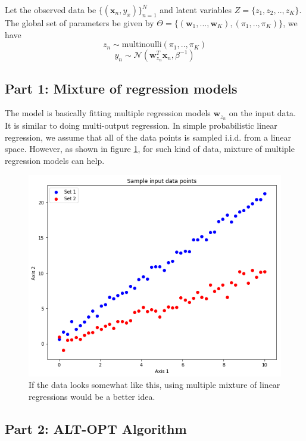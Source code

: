 \documentclass[a4paper,11pt]{article}
\begin{document}
\begin{mlsolution}
Let the observed data be $\{(\textbf{x}_n, y_x)\}^{N}_{n=1}$ and latent variables $Z = \{z_1, z_2, ..,z_K\}$. The global set of parameters be given by $\Theta = \{(\textbf{w}_1,... ,\textbf{w}_K), (\pi_1,..,\pi_K)\}$, we have
\[
z_n \sim \text{multinoulli}(\pi_1,.., \pi_K) 
\]
\[
y_n \sim \mathcal{N}(\textbf{w}^{T}_{z_n}\textbf{x}_n, \beta^{-1})
\]

\subsection{Part 1: Mixture of regression models}
The model is basically fitting multiple regression models $\textbf{w}_{z_n}$ on the input data. It is similar to doing multi-output regression. In simple probabilistic linear regression, we assume that all of the data points is sampled i.i.d. from a linear space. However, as shown in figure \ref{illus}, for such kind of data, mixture of multiple regression models can help.
\begin{figure}[!htbp]
	\centering
	\includegraphics[width=0.3\textheight]{illustrate_p5.png}
	\caption{If the data looks somewhat like this, using multiple mixture of linear regressions would be a better idea.}
	\label{illus}
\end{figure} 

\subsection{Part 2: ALT-OPT Algorithm}


\end{mlsolution}
\end{document}

